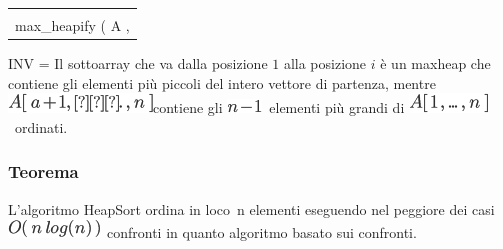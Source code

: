 \documentclass{article}
\begin{document}
{\begin{longtable}[]{@{}l@{}}
\begin{minipage}[t]{0.97\columnwidth}
{-= }{1}{\\
\hspace*{0.333em}\hspace*{0.333em}\hspace*{0.333em}\hspace*{0.333em}\hspace*{0.333em}\hspace*{0.333em}\hspace*{0.333em}\hspace*{0.333em}\hspace*{0.333em}\hspace*{0.333em}\hspace*{0.333em}\hspace*{0.333em}\hspace*{0.333em}\hspace*{0.333em}\hspace*{0.333em}\hspace*{0.333em}max\_heapify
( A , }{1}{~)}\strut
\end{minipage}\tabularnewline
\bottomrule
\end{longtable}

{}

{INV = Il sottoarray che va dalla posizione $1$ alla posizione $i$ è un maxheap che contiene gli elementi più piccoli del intero vettore di partenza, mentre }\includegraphics{images/image138.png}{contiene gli }\includegraphics{images/image139.png}{~elementi più grandi di }\includegraphics{images/image140.png}{~}{ordinati}{.}

\hypertarget{h.rdu8s741ww8w}{\subsubsection{\texorpdfstring{{Teorema}}{Teorema}}\label{h.rdu8s741ww8w}}

{L'algoritmo HeapSort ordina }{in loco}{~n elementi eseguendo nel peggiore dei casi }\includegraphics{images/image141.png}{~confronti in quanto algoritmo }{basato sui confronti.}

}
\end{document}
